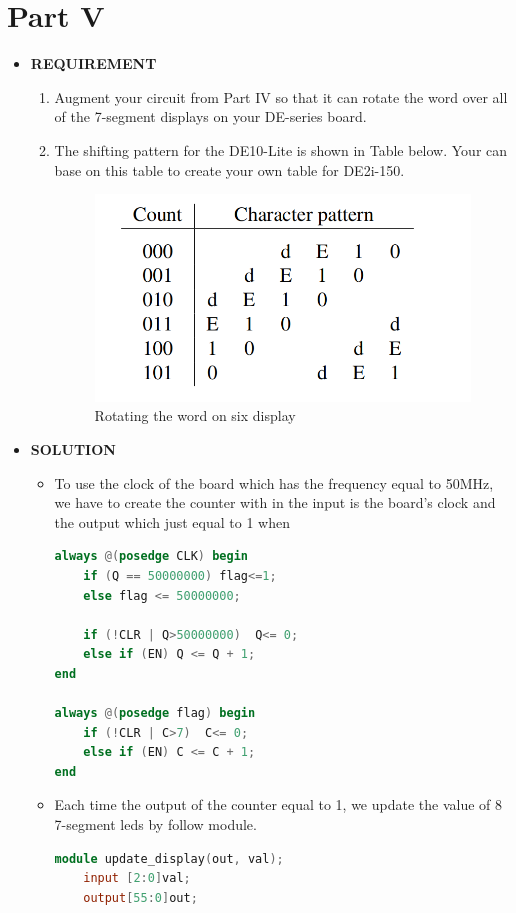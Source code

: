 \section{Part V}
\begin{itemize}
    \item []\textbf{REQUIREMENT}
        \begin{enumerate}
            \item Augment your circuit from Part IV so that it can rotate the word over all of the 7-segment displays on your DE-series board. 
            \item The shifting pattern for the DE10-Lite is shown in Table below. Your can base on this table to create your own table for DE2i-150.
                \begin{figure}[h]
                    \centering
                    \includegraphics[width=10cm]{source/picture/lab4/Lab4_table1.png}
                    \caption{Rotating the word on six display}
                \end{figure}
        \end{enumerate}
    \item []\textbf{SOLUTION}
        \begin{itemize}
            \item []To use the clock of the board which has the frequency equal to 50MHz, we have to create the counter with in the input is the board’s clock and the output which just equal to 1 when                    
                \begin{lstlisting}[language = verilog]
always @(posedge CLK) begin
    if (Q == 50000000) flag<=1;
    else flag <= 50000000;
    
    if (!CLR | Q>50000000)  Q<= 0;
    else if (EN) Q <= Q + 1;
end

always @(posedge flag) begin
    if (!CLR | C>7)  C<= 0;
    else if (EN) C <= C + 1;
end
                    \end{lstlisting}
            \item []Each time the output of the counter equal to 1, we update the value of 8 7-segment leds by follow module.
                \begin{lstlisting}[language = verilog]
module update_display(out, val);
	input [2:0]val;
	output[55:0]out;
	

\end{lstlisting}
\end{itemize}
\end{itemize}
